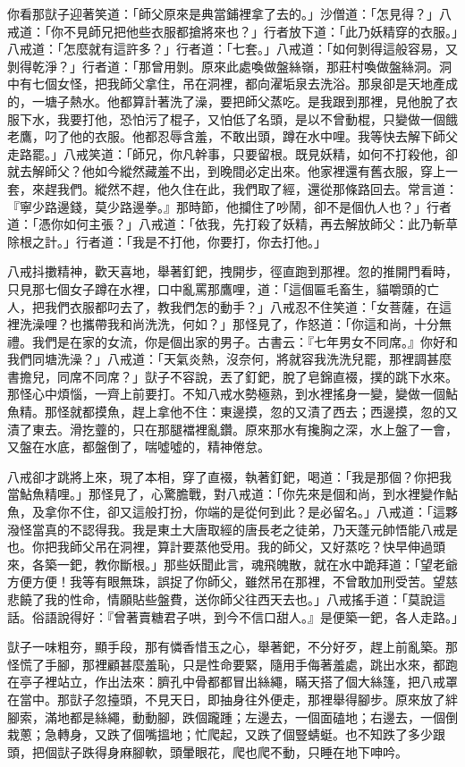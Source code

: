 你看那獃子迎著笑道：「師父原來是典當鋪裡拿了去的。」沙僧道：「怎見得？」八戒道：「你不見師兄把他些衣服都搶將來也？」行者放下道：「此乃妖精穿的衣服。」八戒道：「怎麼就有這許多？」行者道：「七套。」八戒道：「如何剝得這般容易，又剝得乾淨？」行者道：「那曾用剝。原來此處喚做盤絲嶺，那莊村喚做盤絲洞。洞中有七個女怪，把我師父拿住，吊在洞裡，都向濯垢泉去洗浴。那泉卻是天地產成的，一塘子熱水。他都算計著洗了澡，要把師父蒸吃。是我跟到那裡，見他脫了衣服下水，我要打他，恐怕污了棍子，又怕低了名頭，是以不曾動棍，只變做一個餓老鷹，叼了他的衣服。他都忍辱含羞，不敢出頭，蹲在水中哩。我等快去解下師父走路罷。」八戒笑道：「師兄，你凡幹事，只要留根。既見妖精，如何不打殺他，卻就去解師父？他如今縱然藏羞不出，到晚間必定出來。他家裡還有舊衣服，穿上一套，來趕我們。縱然不趕，他久住在此，我們取了經，還從那條路回去。常言道：『寧少路邊錢，莫少路邊拳。』那時節，他攔住了吵鬧，卻不是個仇人也？」行者道：「憑你如何主張？」八戒道：「依我，先打殺了妖精，再去解放師父：此乃斬草除根之計。」行者道：「我是不打他，你要打，你去打他。」

八戒抖擻精神，歡天喜地，舉著釘鈀，拽開步，徑直跑到那裡。忽的推開門看時，只見那七個女子蹲在水裡，口中亂罵那鷹哩，道：「這個匾毛畜生，貓嚼頭的亡人，把我們衣服都叼去了，教我們怎的動手？」八戒忍不住笑道：「女菩薩，在這裡洗澡哩？也攜帶我和尚洗洗，何如？」那怪見了，作怒道：「你這和尚，十分無禮。我們是在家的女流，你是個出家的男子。古書云：『七年男女不同席。』你好和我們同塘洗澡？」八戒道：「天氣炎熱，沒奈何，將就容我洗洗兒罷，那裡調甚麼書擔兒，同席不同席？」獃子不容說，丟了釘鈀，脫了皂錦直裰，撲的跳下水來。那怪心中煩惱，一齊上前要打。不知八戒水勢極熟，到水裡搖身一變，變做一個鮎魚精。那怪就都摸魚，趕上拿他不住：東邊摸，忽的又漬了西去；西邊摸，忽的又漬了東去。滑扢虀的，只在那腿襠裡亂鑽。原來那水有攙胸之深，水上盤了一會，又盤在水底，都盤倒了，喘噓噓的，精神倦怠。

八戒卻才跳將上來，現了本相，穿了直裰，執著釘鈀，喝道：「我是那個？你把我當鮎魚精哩。」那怪見了，心驚膽戰，對八戒道：「你先來是個和尚，到水裡變作鮎魚，及拿你不住，卻又這般打扮，你端的是從何到此？是必留名。」八戒道：「這夥潑怪當真的不認得我。我是東土大唐取經的唐長老之徒弟，乃天蓬元帥悟能八戒是也。你把我師父吊在洞裡，算計要蒸他受用。我的師父，又好蒸吃？快早伸過頭來，各築一鈀，教你斷根。」那些妖聞此言，魂飛魄散，就在水中跪拜道：「望老爺方便方便！我等有眼無珠，誤捉了你師父，雖然吊在那裡，不曾敢加刑受苦。望慈悲饒了我的性命，情願貼些盤費，送你師父往西天去也。」八戒搖手道：「莫說這話。俗語說得好：『曾著賣糖君子哄，到今不信口甜人。』是便築一鈀，各人走路。」

獃子一味粗夯，顯手段，那有憐香惜玉之心，舉著鈀，不分好歹，趕上前亂築。那怪慌了手腳，那裡顧甚麼羞恥，只是性命要緊，隨用手侮著羞處，跳出水來，都跑在亭子裡站立，作出法來：臍孔中骨都都冒出絲繩，瞞天搭了個大絲篷，把八戒罩在當中。那獃子忽擡頭，不見天日，即抽身往外便走，那裡舉得腳步。原來放了絆腳索，滿地都是絲繩，動動腳，跌個躘踵；左邊去，一個面磕地；右邊去，一個倒栽蔥；急轉身，又跌了個嘴搵地；忙爬起，又跌了個豎蜻蜓。也不知跌了多少跟頭，把個獃子跌得身麻腳軟，頭暈眼花，爬也爬不動，只睡在地下呻吟。

